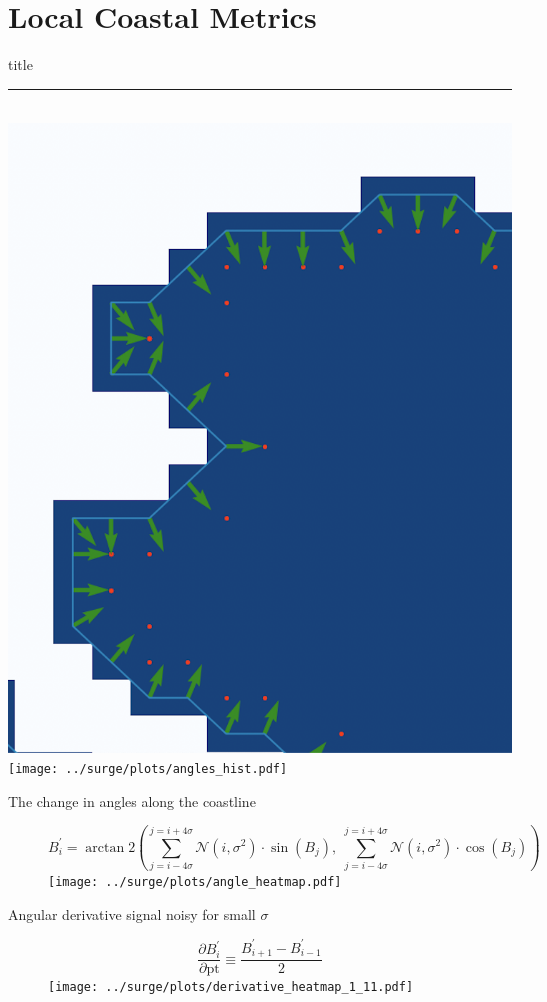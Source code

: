 \documentclass[usenames, dvipsnames]{beamer}
\begin{document}
\section{Local Coastal Metrics}
    \begin{frame}[plain]
        \vfill
      \centering
      \begin{beamercolorbox}[sep=8pt,center,shadow=true,rounded=true]{title}
        \insertsectionhead\par%
        \color{oxfordblue}\noindent\rule{10cm}{1pt} \\
        \includegraphics[width=0.4\linewidth]{images/example-images/new-orleans-example.png}
        \texttt{[image: ../surge/plots/angles\_hist.pdf]}
      \end{beamercolorbox}
      \vfill
  \end{frame}


\begin{frame}{The change in angles along the coastline}
\vspace{-20pt}
\begin{figure}[htb!]
    \centering
    \begin{equation}
B_i^{\prime}=\operatorname{arctan} 2\left(\sum_{j=i-4\sigma}^{j=i+4\sigma}
     \mathcal{N}(i, \sigma^{2})\cdot \sin{( B_{j})},\; \sum_{j=i-4\sigma}^{j=i+4\sigma}
      \mathcal{N}(i, \sigma^{2})\cdot  \cos{( B_{j})}\right)
\end{equation}
    \texttt{[image: ../surge/plots/angle\_heatmap.pdf]}
\end{figure}
\end{frame}


\begin{frame}{Angular derivative signal noisy for small $\sigma$}
\vspace{-20pt}
\begin{figure}[htb!]
    \centering
        \begin{equation}
        \frac{\partial B_i^{\prime}}{\partial \mathrm{pt}} \equiv \frac{B_{i+1}^{\prime}-B_{i-1}^{\prime}}{2}
\end{equation}
    \texttt{[image: ../surge/plots/derivative\_heatmap\_1\_11.pdf]}
\end{figure}
\end{frame}
\end{document}
